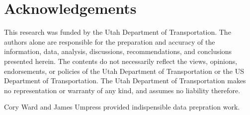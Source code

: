 \documentclass[numbered]{trbarticle}
\begin{document}
\hypertarget{acknowledgements}{%
\section*{Acknowledgements}\label{acknowledgements}}

This research was funded by the Utah Department of Transportation. The authors
alone are responsible for the preparation and accuracy of the information, data,
analysis, discussions, recommendations, and conclusions presented herein. The
contents do not necessarily reflect the views, opinions, endorsements, or
policies of the Utah Department of Transportation or the US Department of
Transportation. The Utah Department of Transportation makes no representation or
warranty of any kind, and assumes no liability therefore.

Cory Ward and James Umpress provided indispensible data prepration work.

\newpage

\end{document}
